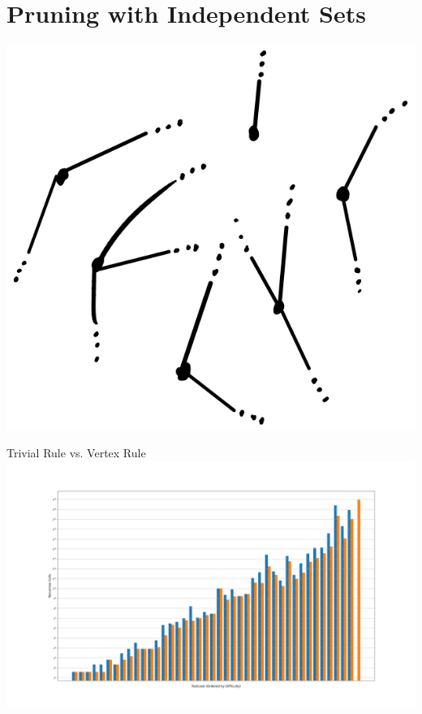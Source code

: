 \documentclass[12pt]{article}
\begin{document}
\newpage
\section*{Pruning with Independent Sets}

    \hfill \includegraphics{fig18.png} \hspace*{\fill}


\newpage
\begin{center} Trivial Rule vs. Vertex Rule\\\includegraphics[scale=.5]{trivialvertex.png} \end{center}
\end{document}
